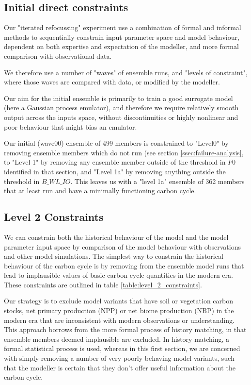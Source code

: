 \documentclass[gmd, manuscript]{copernicus}
\begin{document}
\subsection{Initial direct constraints}

Our "iterated refocussing" experiment use a combination of formal and informal methods to sequentially constrain input parameter space and model behaviour, dependent on both expertise and expectation of the modeller, and more formal comparison with observational data.

We therefore use a number of "waves" of ensemble runs, and  "levels of constraint", where those waves are compared with data, or modified by the modeller. 

Our aim for the initial ensemble is primarily to train a good surrogate model (here a Gaussian process emulator), and therefore we require relatively smooth output across the inputs space, without discontinuities or highly nonlinear and poor behaviour that might bias an emulator.

Our initial (wave00) ensemble of 499 members is constrained to "Level0" by removing ensemble members which do not run (see section \ref{ssec:failure-analysis}, to "Level 1" by removing any ensemble member outside of the threshold in $F0$ identified in that section, and "Level 1a" by removing anything outside the threshold in $B\_WL\_IO$. This leaves us with a "level 1a" ensemble of 362 members that at least run and have a minimally functioning carbon cycle.

\subsection{Level 2 Constraints}

We can constrain both the historical behaviour of the model and the model parameter input space by comparison of the model behaviour with observations and other model simulations.
The simplest way to constrain the historical behaviour of the carbon cycle is by removing from the ensemble model runs that lead to implausible values of basic carbon cycle quantities in the modern era. These constraints are outlined in table \ref{table:level_2_constraints}.

Our strategy is to exclude model variants that have soil or vegetation carbon stocks, net primary production (NPP) or net biome production (NBP) in the modern era that are inconsistent with modern observations or understanding. This approach borrows from the more formal process of history matching, in that ensemble members deemed implausible are excluded. In history matching, a formal statistical process is used, whereas in this first section, we are concerned with simply removing a number of very poorly behaving model variants, such that the modeller is certain that they don't offer useful information about the carbon cycle.
\end{document}
